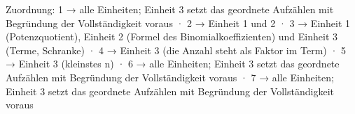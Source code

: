 
Zuordnung: 1 → alle Einheiten; Einheit 3 setzt das geordnete Aufzählen mit Begründung der Vollständigkeit voraus · 2 → Einheit 1 und 2 · 3 → Einheit 1 (Potenzquotient), Einheit 2 (Formel des Binomialkoeffizienten) und Einheit 3 (Terme, Schranke) · 4 → Einheit 3 (die Anzahl steht als Faktor im Term) · 5 → Einheit 3 (kleinstes n) · 6 → alle Einheiten; Einheit 3 setzt das geordnete Aufzählen mit Begründung der Vollständigkeit voraus · 7 → alle Einheiten; Einheit 3 setzt das geordnete Aufzählen mit Begründung der Vollständigkeit voraus

